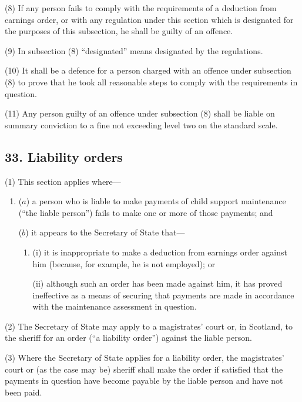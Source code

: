 \documentclass[12pt,a4paper]{article}
\begin{document}
(8) If any person fails to comply with the requirements of a deduction from earnings order, or with any regulation under this section which is designated for the purposes of this subsection, he shall be guilty of an offence.

(9) In subsection (8)  “designated” means designated by the regulations.

(10) It shall be a defence for a person charged with an offence under subsection (8)  to prove that he took all reasonable steps to comply with the requirements in question.

(11) Any person guilty of an offence under subsection (8)  shall be liable on summary conviction to a fine not exceeding level two on the standard scale.


\subsection{33. Liability orders}

(1) This section applies where—
\begin{enumerate}\item[]
($a$) a person who is liable to make payments of child support maintenance (“the liable person”) fails to make one or more of those payments; and

($b$) it appears to the Secretary of State that—
\begin{enumerate}\item[]
(i) it is inappropriate to make a deduction from earnings order against him (because, for example, he is not employed); or

(ii) although such an order has been made against him, it has proved ineffective as a means of securing that payments are made in accordance with the maintenance assessment in question.
\end{enumerate}
\end{enumerate}

(2) The Secretary of State may apply to a magistrates' court or, in Scotland, to the sheriff for an order (“a liability order”) against the liable person.

(3) Where the Secretary of State applies for a liability order, the magistrates' court or (as the case may be) sheriff shall make the order if satisfied that the payments in question have become payable by the liable person and have not been paid.
\end{document}
